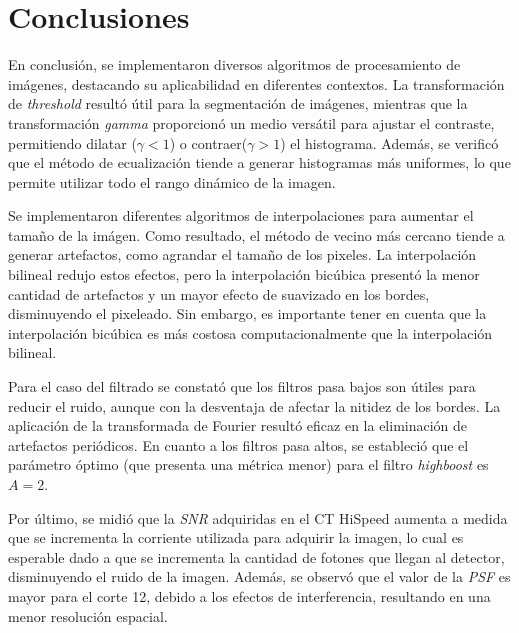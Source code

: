 \documentclass[11pt, twocolumn]{article}
\begin{document}
\section{Conclusiones}

En conclusión, se implementaron diversos algoritmos de procesamiento de imágenes, destacando su aplicabilidad en diferentes contextos. La transformación de \textit{threshold} resultó útil para la segmentación de imágenes, mientras que la transformación \textit{gamma} proporcionó un medio versátil para ajustar el contraste, permitiendo dilatar ($\gamma < 1$) o contraer($\gamma > 1$) el histograma. Además, se verificó que el método de ecualización tiende a generar histogramas más uniformes, lo que permite utilizar todo el rango dinámico de la imagen.

Se implementaron diferentes algoritmos de interpolaciones para aumentar el tamaño de la imágen. Como resultado, el método de vecino más cercano tiende a generar artefactos, como agrandar el tamaño de los pixeles. La interpolación bilineal redujo estos efectos, pero la interpolación bicúbica presentó la menor cantidad de artefactos y un mayor efecto de suavizado en los bordes, disminuyendo el pixeleado. Sin embargo, es importante tener en cuenta que la interpolación bicúbica es más costosa computacionalmente que la interpolación bilineal.


Para el caso del filtrado se constató que los filtros pasa bajos son útiles para reducir el ruido, aunque con la desventaja de afectar la nitidez de los bordes. La aplicación de la transformada de Fourier resultó eficaz en la eliminación de artefactos periódicos. En cuanto a los filtros pasa altos, se estableció que el parámetro óptimo (que presenta una métrica menor) para el filtro \textit{highboost} es $A = 2$.

Por último, se midió que la \textit{SNR} adquiridas en el CT HiSpeed aumenta a medida que se incrementa la corriente utilizada para adquirir la imagen, lo cual es esperable dado a que se incrementa la cantidad de fotones que llegan al detector, disminuyendo el ruido de la imagen. Además, se observó que el valor de la \textit{PSF} es mayor para el corte 12, debido a los efectos de interferencia, resultando en una menor resolución espacial.
\end{document}
